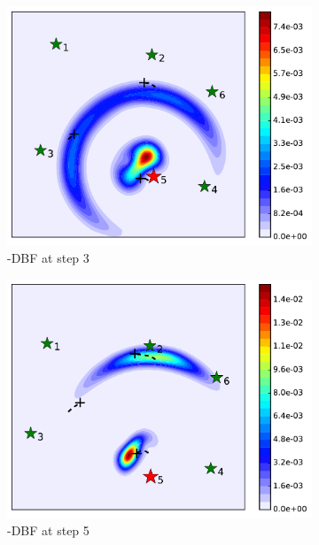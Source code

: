 	
	\begin{figure}%
		\centering		
		\begin{subfigure}[b]{0.23\textwidth}
			\includegraphics[width=\textwidth]{figures/dbf_hetero_mov_sen_mov_tar_rbt5_step3}
			\caption{\proto-DBF at step 3}\label{fig:step3}
		\end{subfigure}
		\begin{subfigure}[b]{0.23\textwidth}
			\includegraphics[width=\textwidth]{figures/dbf_hetero_mov_sen_mov_tar_rbt5_step5}
			\caption{\proto-DBF at step 5}\label{fig:step5}
		\end{subfigure}
		\begin{subfigure}[b]{0.23\textwidth}

\end{subfigure}
\end{figure}
